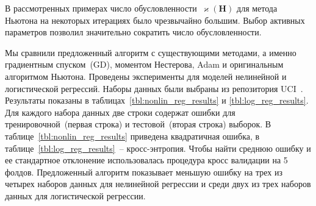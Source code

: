 \documentclass[a4paper,12pt]{article}
\renewcommand{\kappa}{\ensuremath{\varkappa}}
\theoremstyle{plain} %
\theoremstyle{definition} %
\theoremstyle{remark} %
\newcommand{\bH}{\mathbf{H}}
\begin{document}
	В рассмотренных примерах число обусловленности~$\kappa(\bH)$ для метода Ньютона на некоторых итерациях было чрезвычайно большим. 
	Выбор активных параметров позволил значительно сократить число обусловленности. 
	
	Мы сравнили предложенный алгоритм с существующими методами, а именно градиентным спуском~(GD), моментом Нестерова, Adam и оригинальным алгоритмом Ньютона. 
	Проведены эксперименты для моделей нелинейной и логистической регрессий. 
	Наборы данных были выбраны из репозитория UCI~\cite{uci2017}. 
	Результаты показаны в таблицах~\ref{tbl:nonlin_reg_results} и \ref{tbl:log_reg_results}. 
	Для каждого набора данных две строки содержат ошибки для тренировочной~(первая строка) и тестовой~(вторая строка) выборок. 
	В таблице~\ref{tbl:nonlin_reg_results} приведена квадратичная ошибка, в таблице~\ref{tbl:log_reg_results}~-- кросс-энтропия.
	Чтобы найти среднюю ошибку и ее стандартное отклонение использовалась процедура кросс валидации на 5 фолдов. 
	Предложенный алгоритм показывает меньшую ошибку на трех из четырех наборов данных для нелинейной регрессии и среди двух из трех наборов данных для логистической регрессии.
	
\end{document}
